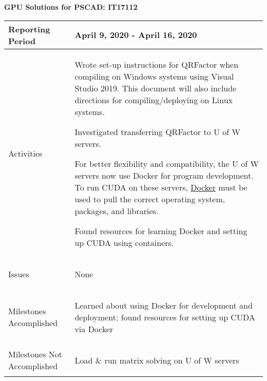 \documentclass[11pt,letterpaper]{article}
\begin{document}
\vspace{.2in}
\begin{center}
    {\bf GPU Solutions for PSCAD: IT17112}
\end{center}

	\vspace{.25in}

\begin{tabular}{| p{} | p{} |}
	\hline
	Reporting Period & April 9, 2020 - April 16, 2020 \\ \hline

	Activities & \begin{enumerate*}
	\item[\tiny\textbullet] Wrote set-up instructions for QRFactor when compiling on Windows systems using Visual Studio 2019. This document will also include directions for compiling/deploying on Linux systems. \newline
  \item[\tiny\textbullet] Investigated transferring QRFactor to U of W servers. \newline
  \item[\tiny\textbullet] For better flexibility and compatibility, the U of W servers now use Docker for program development. To run CUDA on these servers, \href{https://hub.docker.com/}{Docker} must be used to pull the correct operating system, packages, and libraries. \newline
  \item[\tiny\textbullet] Found resources for learning Docker and setting up CUDA using containers.
	\end{enumerate*} \\ \hline

	Issues & \begin{enumerate*}
	\item[\tiny\textbullet] None
	\end{enumerate*} \\ \hline

	Milestones \newline Accomplished & \begin{enumerate*}
	\item[\tiny\textbullet] Learned about using Docker for development and deployment; found resources for setting up CUDA via Docker
  \end{enumerate*} \\ \hline

	Milestones Not \newline Accomplished & \begin{enumerate*}
	\item[\tiny\textbullet] Load \& run matrix solving on U of W servers
	\end{enumerate*} \\ \hline


\end{tabular}
\end{document}
